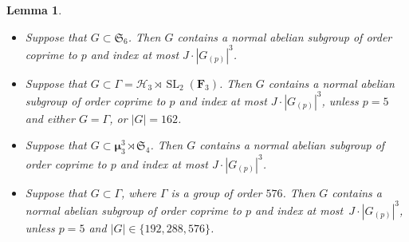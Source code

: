 \documentclass[12pt]{amsart}
\numberwithin{equation}{section}
\newtheorem{lemma}[subsection]{Lemma}
\theoremstyle{definition}
\newcommand{\mumu}{\boldsymbol{\mu}}
\newcommand{\HHH}{\mathscr{H}}
\DeclareMathOperator{\SL}{SL}
\begin{document}
\begin{lemma}
\begin{itemize}
\item[(iv)] Suppose that $G\subset\mathfrak{S}_6$.
Then $G$ contains a normal abelian subgroup
of order coprime to $p$ and index at most $J\cdot |G_{(p)}|^3$.

\item[(v)] Suppose that $G\subset\Gamma=\HHH_3\rtimes\SL_2(\mathbf{F}_3)$.
Then $G$ contains a normal abelian subgroup
of order coprime to $p$ and index at most $J\cdot |G_{(p)}|^3$,
unless $p=5$ and either $G=\Gamma$, or $|G|=162$.

\item[(vi)] Suppose that $G\subset\mumu_3^3\rtimes \mathfrak{S}_4$.
Then $G$ contains a normal abelian subgroup
of order coprime to $p$ and index at most $J\cdot |G_{(p)}|^3$.

\item[(vii)] Suppose that $G\subset\Gamma$, where $\Gamma$ is a group of order $576$.
Then $G$ contains a normal abelian subgroup
of order coprime to $p$ and index at most~\mbox{$J\cdot |G_{(p)}|^3$},
unless $p=5$ and $|G|\in\{192,288,576\}$.
\end{itemize}
\end{lemma}
\end{document}
